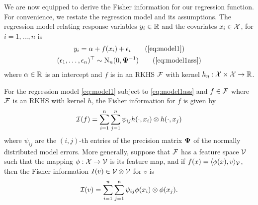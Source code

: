 We are now equipped to derive the Fisher information for our regression function.
For convenience, we restate the regression model and its assumptions.
The regression model relating response variables $y_i \in \mathbb{R}$ and the covariates $x_i \in {\mathcal X} $, for $i=1,\dots,n$ is
\begin{gather}
  y_i = \alpha + f(x_i) + \epsilon_i \tag{\ref{eq:model1}} \\
  (\epsilon_1, \dots, \epsilon_n)^\top \sim \N_n(0, \bPsi^{-1}) \tag{\ref{eq:model1ass}}
\end{gather}
where $\alpha \in \mathbb{R}$ is an intercept and $f$ is in an RKHS ${\mathcal F}$ with kernel $h_\eta:{\mathcal X} \times {\mathcal X} \to \mathbb{R}$.

\begin{lemma}\label{thm:fisherregf}
  For the regression model \cref{eq:model1} subject to \cref{eq:model1ass} and $f \in {\mathcal F}$ where ${\mathcal F}$ is an RKHS with kernel $h$, the Fisher information for $f$ is given by
  \[
    {\mathcal I}(f) = \sum_{i=1}^n\sum_{j=1}^n \psi_{ij} h(\cdot,x_i) \otimes h(\cdot,x_j)
  \]
  where $\psi_{ij}$ are the $(i,j)$-th entries of the precision matrix ${\bm\Psi}$ of the normally distributed model errors.
  More generally, suppose that ${\mathcal F}$ has a feature space ${\mathcal V}$ such that the mapping $\phi:{\mathcal X} \to {\mathcal V}$ is its feature map, and if $f(x)=\langle\phi(x),v\rangle_{\mathcal V}$, then the Fisher information $I(v) \in {\mathcal V} \otimes {\mathcal V}$ for $v$ is
  \[
    {\mathcal I}(v) = \sum_{i=1}^n\sum_{j=1}^n \psi_{ij} \phi(x_i) \otimes \phi(x_j).
  \]
\end{lemma}



